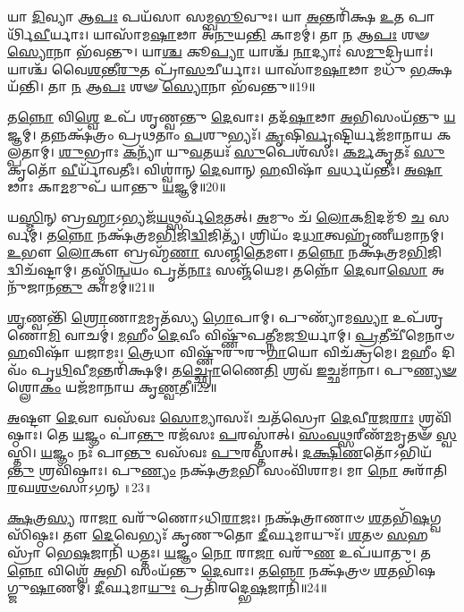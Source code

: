𑌯𑌾 \ul{𑌦𑌿}\-𑌵𑍍𑌯𑌾 𑌆\-\ul{𑌪𑌃} 𑌪𑌯᳴𑌸𑌾 𑌸𑌮𑍍𑌬\-\ul{𑌭𑍂}\-𑌵𑍁𑌃।
𑌯𑌾 \ul{𑌅}\-𑌨𑍍𑌤𑌰𑌿᳴𑌕𑍍𑌷 \ul{𑌉}\-𑌤 𑌪𑌾𑌰𑍍𑌥𑌿᳴\-\ul{𑌵𑍀}\-𑌰𑍍𑌯𑌾𑌃।
𑌯𑌾𑌸𑌾᳴𑌮\-\ul{𑌷𑌾}\-𑌢𑌾 𑌅᳴\-\ul{𑌨𑍁}\-𑌯\-\ul{𑌨𑍍𑌤𑌿} 𑌕𑌾𑌮𑌮𑍍॑।
𑌤𑌾 \ul{𑌨} 𑌆\-\ul{𑌪𑌃} 𑌶𑍟 \ul{𑌸𑍍𑌯𑍋}\-𑌨𑌾 𑌭᳴𑌵𑌨𑍍𑌤𑍁।
𑌯𑌾\-\ul{𑌶𑍍𑌚} 𑌕𑍂\-\ul{𑌪𑍍𑌯𑌾} 𑌯𑌾𑌶𑍍𑌚᳴ \ul{𑌨𑌾}\-𑌦𑍍𑌯𑌾𑌃॑ 𑌸\-\ul{𑌮𑍁}\-𑌦𑍍𑌰𑌿𑌯𑌾𑌃॑।
𑌯𑌾𑌶𑍍𑌚᳴ 𑌵𑍈\-\ul{𑌶}\-𑌨𑍍𑌤𑍀\-\ul{𑌰𑍁}\-𑌤 𑌪𑍍𑌰𑌾᳴\-\ul{𑌸}\-𑌚𑍀𑌰𑍍𑌯𑌾𑌃।
𑌯𑌾𑌸𑌾᳴𑌮\-\ul{𑌷𑌾}\-𑌢𑌾 𑌮𑌧𑍁᳴ \ul{𑌭}\-𑌕𑍍𑌷𑌯᳴𑌨𑍍𑌤𑌿।
𑌤𑌾 \ul{𑌨} 𑌆\-\ul{𑌪𑌃} 𑌶𑍟 \ul{𑌸𑍍𑌯𑍋}\-𑌨𑌾 𑌭᳴𑌵𑌨𑍍𑌤𑍁॥19॥ 

𑌤\-\ul{𑌨𑍍𑌨𑍋} 𑌵𑌿\-\ul{𑌶𑍍𑌵𑍇} 𑌉𑌪᳴ 𑌶𑍃𑌣𑍍𑌵𑌨𑍍𑌤𑍁 \ul{𑌦𑍇}\-𑌵𑌾𑌃।
𑌤𑌦᳴\-\ul{𑌷𑌾}\-𑌢𑌾 \ul{𑌅}\-𑌭𑌿𑌸𑌂𑌯᳴𑌨𑍍𑌤𑍁 \ul{𑌯}\-𑌜𑍍𑌞𑌮𑍍।
𑌤𑌨𑍍𑌨𑌕𑍍𑌷᳴𑌤𑍍𑌰𑌂 𑌪𑍍𑌰𑌥𑌤𑌾𑌂 \ul{𑌪}\-𑌶𑍁𑌭𑍍𑌯𑌃᳴।
\-\ul{𑌕𑍃}\-𑌷𑌿\-\ul{𑌰𑍍𑌵𑍃}\-𑌷𑍍𑌟𑌿𑌰𑍍𑌯𑌜᳴𑌮𑌾𑌨𑌾𑌯 𑌕𑌲𑍍𑌪𑌤𑌾𑌮𑍍।
\-\ul{𑌶𑍁}\-𑌭𑍍𑌰𑌾𑌃 \ul{𑌕}\-𑌨𑍍𑌯𑌾᳴ 𑌯𑍁\-\ul{𑌵}\-𑌤𑌯𑌃᳴ \ul{𑌸𑍁}\-𑌪𑍇𑌶᳴𑌸𑌃।
\-\ul{𑌕}\-\-\ul{𑌰𑍍𑌮}\-𑌕𑍃𑌤𑌃᳴ \ul{𑌸𑍁}\-𑌕𑍃𑌤𑍋᳴ \ul{𑌵𑍀}\-𑌰𑍍𑌯𑌾᳴𑌵𑌤𑍀𑌃।
𑌵𑌿𑌶𑍍𑌵𑌾॑𑌨𑍍 \ul{𑌦𑍇}\-𑌵𑌾𑌨𑍍 \ul{𑌹}\-𑌵𑌿𑌷𑌾᳴ \ul{𑌵}\-𑌰𑍍𑌧𑌯᳴𑌨𑍍𑌤𑍀𑌃।
\-\ul{𑌅}\-\-\ul{𑌷𑌾}\-𑌢𑌾𑌃 𑌕𑌾\-\ul{𑌮}\-𑌮𑍁𑌪᳴ 𑌯𑌾𑌨𑍍𑌤𑍁 \ul{𑌯}\-𑌜𑍍𑌞𑌮𑍍॥20॥ 

𑌯\-\ul{𑌸𑍍𑌮𑌿}\-𑌨𑍍 𑌬𑍍𑌰\-\ul{𑌹𑍍𑌮𑌾}\-\-𑌽𑌭𑍍𑌯𑌜᳴\-\ul{𑌯}\-𑌥𑍍𑌸𑌰𑍍𑌵᳴\-\ul{𑌮𑍇}\-𑌤𑌤𑍍।
\-\ul{𑌅}\-𑌮𑍁𑌂 𑌚᳴ \ul{𑌲𑍋}\-𑌕\-\ul{𑌮𑌿}\-𑌦𑌮𑍂᳴ \ul{𑌚} 𑌸𑌰𑍍𑌵𑌮𑍍॑।
𑌤\-\ul{𑌨𑍍𑌨𑍋} 𑌨𑌕𑍍𑌷᳴𑌤𑍍𑌰𑌮\-\ul{𑌭𑌿}\-𑌜𑌿\-\ul{𑌦𑍍𑌵𑌿}\-𑌜𑌿𑌤𑍍𑌯᳴।
𑌶𑍍𑌰𑌿𑌯𑌂᳴ 𑌦\-\ul{𑌧𑌾}\-𑌤𑍍𑌵𑌹𑍃᳴𑌣𑍀𑌯\-𑌮𑌾𑌨𑌮𑍍।
\-\ul{𑌉}\-𑌭𑍗 \ul{𑌲𑍋}\-𑌕𑍗 𑌬𑍍𑌰𑌹𑍍𑌮᳴\-\ul{𑌣𑌾} 𑌸𑌞𑍍𑌜𑌿᳴\-\ul{𑌤𑍇}\-𑌮𑍗।
𑌤\-\ul{𑌨𑍍𑌨𑍋} 𑌨𑌕𑍍𑌷᳴𑌤𑍍𑌰𑌮\-\ul{𑌭𑌿}\-𑌜𑌿𑌦𑍍𑌵𑌿𑌚᳴𑌷𑍍𑌟𑌾𑌮𑍍।
𑌤𑌸𑍍𑌮𑌿᳴\-\ul{𑌨𑍍𑌵}\-𑌯𑌂 𑌪𑍃𑌤᳴\-\ul{𑌨𑌾𑌃} 𑌸𑌞𑍍𑌜᳴𑌯𑍇𑌮।
𑌤𑌨𑍍𑌨𑍋᳴ \ul{𑌦𑍇}\-𑌵𑌾\-\ul{𑌸𑍋} 𑌅𑌨𑍁᳴𑌜𑌾𑌨\-\ul{𑌨𑍍𑌤𑍁} 𑌕𑌾𑌮𑌮𑍍॑॥21॥ 

\-\ul{𑌶𑍃}\-𑌣𑍍𑌵𑌨𑍍𑌤𑌿᳴ \ul{𑌶𑍍𑌰𑍋}\-𑌣𑌾\-\ul{𑌮}\-𑌮𑍃𑌤᳴𑌸𑍍𑌯 \ul{𑌗𑍋}\-𑌪𑌾𑌮𑍍।
𑌪𑍁𑌣𑍍𑌯𑌾᳴𑌮\-\ul{𑌸𑍍𑌯𑌾} 𑌉𑌪᳴𑌶𑍃𑌣𑍋\-\ul{𑌮𑌿} 𑌵𑌾𑌚𑌮𑍍॑।
\-\ul{𑌮}\-𑌹𑍀𑌂 \ul{𑌦𑍇}\-𑌵𑍀𑌂 𑌵𑌿𑌷𑍍𑌣𑍁᳴𑌪𑌤𑍍𑌨𑍀𑌮\-\ul{𑌜𑍂}\-𑌰𑍍𑌯𑌾𑌮𑍍।
\-\ul{𑌪𑍍𑌰}\-𑌤𑍀𑌚𑍀᳴𑌮𑍇𑌨𑌾𑍞 \ul{𑌹}\-𑌵𑌿𑌷𑌾᳴ 𑌯𑌜𑌾𑌮𑌃।
\-\ul{𑌤𑍍𑌰𑍇}\-𑌧𑌾 𑌵𑌿𑌷𑍍𑌣𑍁᳴𑌰𑍁𑌰𑍁\-\ul{𑌗𑌾}\-𑌯𑍋 𑌵𑌿𑌚᳴𑌕𑍍𑌰𑌮𑍇।
\-\ul{𑌮}\-𑌹𑍀𑌂 𑌦𑌿𑌵𑌂᳴ 𑌪𑍃\-\ul{𑌥𑌿}\-𑌵𑍀\-\ul{𑌮}\-𑌨𑍍𑌤𑌰𑌿᳴𑌕𑍍𑌷𑌮𑍍।
𑌤\-\ul{𑌚𑍍𑌛𑍍𑌰𑍋}\-𑌣𑍈\-\ul{𑌤𑌿} 𑌶𑍍𑌰𑌵᳴ \ul{𑌇}\-𑌚𑍍𑌛𑌮𑌾᳴𑌨𑌾।
𑌪𑍁\-\ul{𑌣𑍍𑌯}\-\-\ul{𑍟} 𑌶𑍍𑌲𑍋\-\ul{𑌕𑌂} 𑌯𑌜᳴𑌮𑌾𑌨𑌾𑌯 𑌕𑍃\-\ul{𑌣𑍍𑌵}\-𑌤𑍀॥22॥ 

\-\ul{𑌅}\-𑌷𑍍𑌟𑍗 \ul{𑌦𑍇}\-𑌵𑌾 𑌵𑌸᳴𑌵𑌃 \ul{𑌸𑍋}\-𑌮𑍍𑌯𑌾𑌸𑌃᳴।
𑌚𑌤᳴𑌸𑍍𑌰𑍋 \ul{𑌦𑍇}\-𑌵𑍀\-\ul{𑌰}\-𑌜\-\ul{𑌰𑌾𑌃} 𑌶𑍍𑌰𑌵𑌿᳴𑌷𑍍𑌠𑌾𑌃।
𑌤𑍇 \ul{𑌯}\-𑌜𑍍𑌞𑌂 𑌪𑌾॑\-\ul{𑌨𑍍𑌤𑍁} 𑌰𑌜᳴𑌸𑌃 \ul{𑌪}\-𑌰𑌸𑍍𑌤𑌾॑𑌤𑍍।
\-\ul{𑌸𑌂}\-\-\ul{𑌵}\-\-\ul{𑌥𑍍𑌸}\-𑌰𑍀𑌣᳴\-\ul{𑌮}\-𑌮𑍃𑌤𑍟᳴ \ul{𑌸𑍍𑌵}\-𑌸𑍍𑌤𑌿।
\-\ul{𑌯}\-𑌜𑍍𑌞𑌂 𑌨𑌃᳴ 𑌪𑌾\-\ul{𑌨𑍍𑌤𑍁} 𑌵𑌸᳴𑌵𑌃 \ul{𑌪𑍁}\-𑌰𑌸𑍍𑌤𑌾॑𑌤𑍍।
\-\ul{𑌦}\-\-\ul{𑌕𑍍𑌷𑌿}\-\-\ul{𑌣}\-𑌤𑍋᳴𑌽𑌭𑌿𑌯᳴\-\ul{𑌨𑍍𑌤𑍁} 𑌶𑍍𑌰𑌵𑌿᳴𑌷𑍍𑌠𑌾𑌃।
𑌪𑍁\-\ul{𑌣𑍍𑌯𑌂} 𑌨𑌕𑍍𑌷᳴𑌤𑍍𑌰\-\ul{𑌮}\-𑌭𑌿 𑌸𑌂𑌵𑌿᳴𑌶𑌾𑌮।
𑌮𑌾 \ul{𑌨𑍋} 𑌅𑌰𑌾᳴𑌤𑌿\-\ul{𑌰}\-𑌘\-\ul{𑌶}\-\-\ul{𑍞}\-𑌸𑌾𑌽𑌗𑌨𑍍{}॥23॥ 

\-\ul{𑌕𑍍𑌷}\-𑌤𑍍𑌰\-\ul{𑌸𑍍𑌯} 𑌰𑌾\-\ul{𑌜𑌾} 𑌵𑌰𑍁᳴𑌣𑍋𑌽𑌧𑌿\-\ul{𑌰𑌾}\-𑌜𑌃।
𑌨𑌕𑍍𑌷᳴𑌤𑍍𑌰𑌾𑌣𑌾𑍞 \ul{𑌶}\-𑌤𑌭𑌿᳴\-\ul{𑌷}\-𑌗𑍍𑌵𑌸𑌿᳴𑌷𑍍𑌠𑌃।
𑌤𑍗 \ul{𑌦𑍇}\-𑌵𑍇𑌭𑍍𑌯𑌃᳴ 𑌕𑍃𑌣𑍁𑌤𑍋 \ul{𑌦𑍀}\-𑌰𑍍𑌘𑌮𑌾𑌯𑍁𑌃᳴।
\-\ul{𑌶}\-𑌤𑍞 \ul{𑌸}\-𑌹𑌸𑍍𑌰𑌾᳴ 𑌭𑍇\-\ul{𑌷}\-𑌜𑌾𑌨𑌿᳴ 𑌧𑌤𑍍𑌤𑌃।
\-\ul{𑌯}\-𑌜𑍍𑌞𑌂 \ul{𑌨𑍋} 𑌰𑌾\-\ul{𑌜𑌾} 𑌵𑌰𑍁᳴\-\ul{𑌣} 𑌉𑌪᳴𑌯𑌾𑌤𑍁।
𑌤\-\ul{𑌨𑍍𑌨𑍋} 𑌵𑌿𑌶𑍍𑌵𑍇᳴ \ul{𑌅}\-𑌭𑌿 𑌸𑌂𑌯᳴𑌨𑍍𑌤𑍁 \ul{𑌦𑍇}\-𑌵𑌾𑌃।
𑌤\-\ul{𑌨𑍍𑌨𑍋} 𑌨𑌕𑍍𑌷᳴𑌤𑍍𑌰𑍞 \ul{𑌶}\-𑌤𑌭𑌿᳴𑌷𑌗𑍍𑌜𑍁\-\ul{𑌷𑌾}\-𑌣𑌮𑍍।
\-\ul{𑌦𑍀}\-𑌰𑍍𑌘𑌮𑌾\-\ul{𑌯𑍁𑌃} 𑌪𑍍𑌰𑌤𑌿᳴𑌰𑌦𑍍𑌭𑍇\-\ul{𑌷}\-𑌜𑌾𑌨𑌿᳴॥24॥ 

